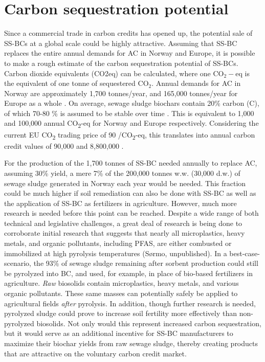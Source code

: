 \section{Carbon sequestration potential}
Since a commercial trade in carbon credits has opened up, the potential sale of SS-BCs at a global scale could be highly attractive. Assuming that SS-BC replaces the entire annual demands for AC in Norway and Europe, it is possible to make a rough estimate of the carbon sequestration potential of SS-BCs. Carbon dioxide equivalents (\acrshort{CO2eq}) can be calculated, where one $\mathrm{CO_2-eq}$ is the equivalent of one tonne of sequestered $\mathrm{CO_2}$. Annual demands for AC in Norway are approximately 1,700 tonnes/year, and 165,000 tonnes/year for Europe as a whole \citep{schmidt2019pyrogenic}. On average, sewage sludge biochars contain 20\% carbon (C), of which 70-80 \% is assumed to be stable over time \citep{schmidt2019pyrogenic}. This is equivalent to 1,000 and 100,000 annual CO\textsubscript{2}-eq for Norway and Europe respectively. Considering the current EU CO\textsubscript{2} trading price of 90 \texteuro/CO\textsubscript{2}-eq, this translates into annual carbon credit values of 90,000 and 8,800,000 \texteuro. 

For the production of the 1,700 tonnes of SS-BC needed annually to replace AC, assuming 30\% yield, a mere 7\% of the 200,000 tonnes w.w. (30,000 d.w.) of sewage sludge generated in Norway each year would be needed. This fraction could be much higher if soil remediation can also be done with SS-BC as well as the application of SS-BC as fertilizers in agriculture. However, much more research is needed before this point can be reached. Despite a wide range of both technical and legislative challenges, a great deal of research is being done to corroborate initial research that suggests that nearly all microplastics, heavy metals, and organic pollutants, including PFAS, are either combusted or immobilized at high pyrolysis temperatures (S\o rmo, unpublished). In a best-case-scenario, the 93\% of sewage sludge remaining after sorbent production could still be pyrolyzed into BC, and used, for example, in place of bio-based fertilizers in agriculture. \textit{Raw} biosolids contain microplastics, heavy metals, and various organic pollutants. These same masses can potentially safely be applied to agricultural fields \textit{after} pyrolysis. In addition, though further research is needed, pyrolyzed sludge could prove to increase soil fertility more effectively than non-pyrolyzed biosolids. Not only would this represent increased carbon sequestration, but it would serve as an additional incentive for SS-BC manufacturers to maximize their biochar yields from raw sewage sludge, thereby creating products that are attractive on the voluntary carbon credit market. 

